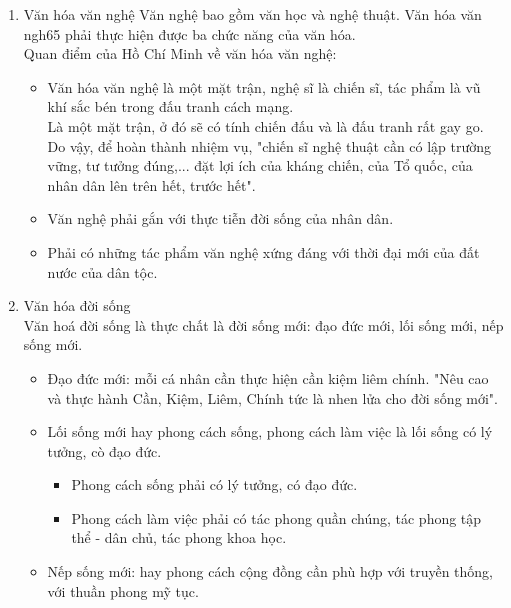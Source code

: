 \documentclass{article}
\begin{document}
\begin{enumerate}
		\item Văn hóa văn nghệ
		Văn nghệ bao gồm văn học và nghệ thuật. Văn hóa văn ngh65 phải thực hiện được ba chức năng của văn hóa.\\
		Quan điểm của Hồ Chí Minh về văn hóa văn nghệ:
		\begin{itemize}
			\item Văn hóa văn nghệ là một mặt trận, nghệ sĩ là chiến sĩ, tác phẩm là vũ khí sắc bén trong đấu tranh cách mạng.\\
			Là một mặt trận, ở đó sẽ có tính chiến đấu và là đấu tranh rất gay go. Do vậy, để hoàn thành nhiệm vụ, "chiến sĩ nghệ thuật cần có lập trường vững, tư tưởng đúng,... đặt lợi ích của kháng chiến, của Tổ quốc, của nhân dân lên trên hết, trước hết".
			\item Văn nghệ phải gắn với thực tiễn đời sống của nhân dân.
			\item Phải có những tác phẩm văn nghệ xứng đáng với thời đại mới của đất nước của dân tộc.
		\end{itemize}
		\item Văn hóa đời sống\\
		Văn hoá đời sống là thực chất là đời sống mới: đạo đức mới, lối sống mới, nếp sống mới.
		\begin{itemize}
			\item Đạo đức mới: mỗi cá nhân cần thực hiện cần kiệm liêm chính. "Nêu cao và thực hành Cần, Kiệm, Liêm, Chính tức là nhen lửa cho đời sống mới".
			\item Lối sống mới hay phong cách sống, phong cách làm việc là lối sống có lý tưởng, cò đạo đức.
			\begin{itemize}
				\item Phong cách sống phải có lý tưởng, có đạo đức.
				\item Phong cách làm việc phải có tác phong quần chúng, tác phong tập thể - dân chủ, tác phong khoa học.
			\end{itemize}
			\item Nếp sống mới: hay phong cách cộng đồng cần phù hợp với truyền thống, với thuần phong mỹ tục.
		\end{itemize}
	\end{enumerate}
\end{document}
